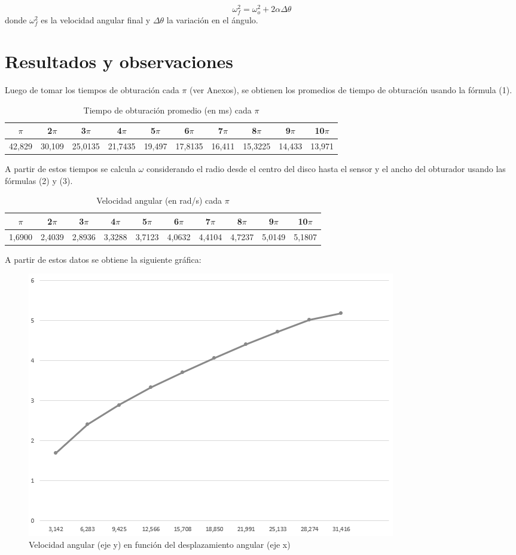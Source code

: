 \documentclass[a4paper]{article}
\begin{document}
\begin{equation}
    \omega_f^2=\omega_o^2+2\alpha \Delta \theta
\end{equation}
donde $\omega_f^2$ es la velocidad angular final y $\Delta \theta$ la variación en el ángulo. 

\section{Resultados y observaciones}
Luego de tomar los tiempos de obturación cada $\pi$ (ver Anexos), se obtienen los promedios de tiempo de obturación usando la fórmula (1).

\begin{table}[!ht]
    \centering
    \begin{tabular}{|c|c|c|c|c|c|c|c|c|c|}
    \hline
        $\pi$ & 2$\pi$ & 3$\pi$ & 4$\pi$ & 5$\pi$ & 6$\pi$ & 7$\pi$ & 8$\pi$ & 9$\pi$ & 10$\pi$  \\ \hline
        42,829  & 30,109  & 25,0135  & 21,7435  & 19,497  & 17,8135  & 16,411  & 15,3225  & 14,433  & 13,971  \\ \hline
    \end{tabular}
    \caption{Tiempo de obturación promedio (en ms) cada $\pi$}
\end{table}

A partir de estos tiempos se calcula $\omega$ considerando el radio desde el centro del disco hasta el sensor y el ancho del obturador usando las fórmulas (2) y (3).

\begin{table}[!ht]
    \centering
    \begin{tabular}{|c|c|c|c|c|c|c|c|c|c|}
    \hline
       $\pi$ & 2$\pi$ & 3$\pi$ & 4$\pi$ & 5$\pi$ & 6$\pi$ & 7$\pi$ & 8$\pi$ & 9$\pi$ & 10$\pi$  \\ \hline
        1,6900  & 2,4039  & 2,8936  & 3,3288  & 3,7123  & 4,0632  & 4,4104  & 4,7237  & 5,0149  & 5,1807  \\ \hline
    \end{tabular}
    \caption{Velocidad angular (en rad/s) cada $\pi$}
\end{table}

A partir de estos datos se obtiene la siguiente gráfica: 
\begin{figure} [H]
    \centering
    \includegraphics[width=0.6 \textwidth]{VangvsDang.png}
    \caption{Velocidad angular (eje y) en función del desplazamiento angular (eje x)}
    \end{figure}
\end{document}
